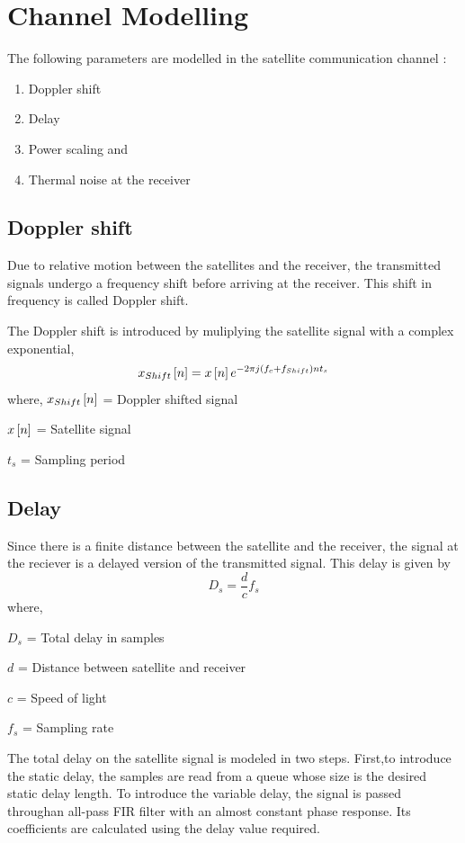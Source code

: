 \documentclass[conference]{IEEEtran}
\begin{document}
\section{Channel Modelling}
The following parameters are modelled in the satellite communication channel \cite{b7}:
\begin{enumerate}
   \item Doppler shift
   \item Delay 
   \item Power scaling and 
   \item Thermal noise at the receiver
\end{enumerate}
\subsection{Doppler shift}
Due to relative motion between the satellites and the receiver, the transmitted signals undergo a 
frequency shift before arriving at the receiver. This shift in frequency is called Doppler shift.

The Doppler shift is introduced by muliplying the satellite signal with a complex exponential,
\begin{equation}
    x_{Shift}{}\left[n\right] = x{}\left[n\right]e^{-2 \pi j \left(f_{c}+f_{Shift}\right) n t_{s}}
\end{equation}
where,
$x_{Shift}{}\left[n\right]$ = Doppler shifted signal

$x{}\left[n\right]$ = Satellite signal

$t_{s}$ = Sampling period
\subsection{Delay}
Since there is a finite distance between the satellite and the receiver, the signal at the reciever is a delayed version of the transmitted signal. This delay is given by
\begin{equation}
    D_{s} = \frac{d}{c}f_{s} 
\end{equation}
where,

$D_{s}$ = Total delay in samples

$d$ = Distance between satellite and receiver

$c$ = Speed of light

$f_{s}$ = Sampling rate

The total delay on the satellite signal is modeled in two steps. First,to introduce the static delay,
the samples are read from a queue whose size is the desired static delay length. To introduce the 
variable delay, the signal is passed throughan all-pass FIR filter with an almost constant phase 
response. Its coefficients are calculated using the delay value required.
\end{document}
